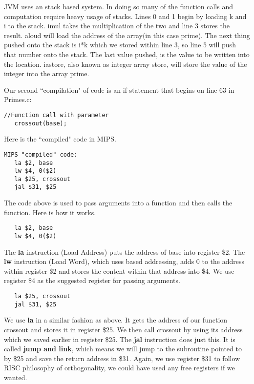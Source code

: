 \documentclass[11pt]{article}
\begin{document}
JVM uses an stack based system. In doing so many of the function calls and computation require heavy usage of stacks. Lines 0 and 1 begin by loading k and i to the stack. imul takes the multiplication of the two and line 3 stores the result. aloud will load the address of the array(in this case prime). The next thing pushed onto the stack is i*k which we stored within line 3, so line 5 will push that number onto the stack. The last value pushed, is the value to be written into the location. iastore, also known as integer array store, will store the value of the integer into the array prime.


Our second ``compilation" of code is an if statement that begins on line 63 in Primes.c:
\begin{verbatim}
//Function call with parameter
   crossout(base);
\end{verbatim}

Here is the ``compiled" code in MIPS.

\begin{verbatim}
MIPS "compiled" code:
   la $2, base
   lw $4, 0($2)
   la $25, crossout
   jal $31, $25
\end{verbatim}

The code above is used to pass arguments into a function and then calls the function. Here is how it works. 

\begin{verbatim}
   la $2, base
   lw $4, 0($2)
\end{verbatim}

The {\bf la} instruction (Load Address) puts the address of base into register \$2. The {\bf lw} instruction (Load Word), which uses based addressing, adds 0 to the address within register \$2 and stores the content within that address into \$4. We use register \$4 as the suggested register for passing arguments.

\begin{verbatim}
   la $25, crossout
   jal $31, $25
\end{verbatim}

We use {\bf la} in a similar fashion as above. It gets the address of our function crossout and stores it in register \$25. We then call crossout by using its address which we saved earlier in register \$25. The {\bf jal} instruction does just this. It is called {\bf jump and link}, which means we will jump to the subroutine pointed to by \$25 and save the return address in \$31. Again, we use register \$31 to follow RISC philosophy of orthogonality, we could have used any free registers if we wanted.
\end{document}

